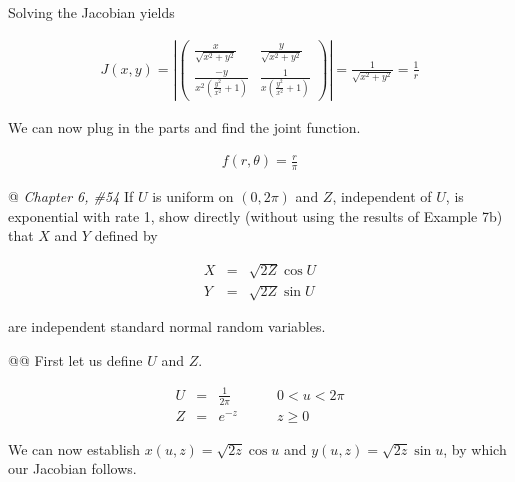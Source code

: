 \documentclass[11pt]{article}\usepackage[]{graphicx}\usepackage[]{xcolor}
\begin{document}
\begin{easylist}[enumerate]
    Solving the Jacobian yields

    \begin{equation}
        \begin{aligned}
            J(x, y) = \left| \begin{pmatrix}
                                 \frac{x}{\sqrt{x^2+y^2} } & \frac{y}{\sqrt{x^2+y^2} }\\
                                 \frac{-y}{x^2 \left(\frac{y^2}{x^2}+1\right)} & \frac{1}{x \left(\frac{y^2}{x^2}+1\right)}
                             \end{pmatrix}
                      \right| = \frac{1}{\sqrt{x^2+y^2} } = \frac{1}{r}
        \end{aligned}
    \end{equation}

    We can now plug in the parts and find the joint function.

    \begin{equation}
        \begin{aligned}
            f(r, \theta) = \frac{r}{\pi}
        \end{aligned}
    \end{equation}

    @ \textit{Chapter 6, \#54} If $U$ is uniform on $(0, 2\pi)$ and $Z$, independent of $U$, is exponential with rate 1,
    show directly (without using the results of Example 7b) that $X$ and $Y$ defined by

    \begin{equation}
        \begin{aligned}
            X &=& \sqrt{2Z}\cos U\\
            Y &=& \sqrt{2Z}\sin U
        \end{aligned}
    \end{equation}

    are independent standard normal random variables.

    @@ First let us define $U$ and $Z$.

    \begin{equation}
        \begin{aligned}
            U &=& \frac{1}{2 \pi} &\qquad 0 < u < 2 \pi\\
            Z &=& e^{-z} &\qquad z \ge 0
        \end{aligned}
    \end{equation}

    We can now establish $x(u, z) = \sqrt{2z}\cos u$ and $y(u, z) = \sqrt{2z}\sin u$, by which our Jacobian follows.


\end{easylist}
\end{document}
